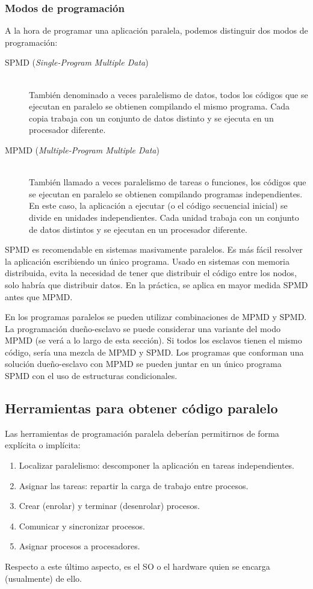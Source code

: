 \subsubsection{Modos de programación}
A la hora de programar una aplicación paralela, podemos distinguir dos modos de programación:
\begin{description}
    \item [SPMD (\emph{Single-Program Multiple Data})]~\\
        También denominado a veces paralelismo de datos, todos los códigos que se ejecutan en paralelo se obtienen compilando el mismo programa. Cada copia trabaja con un conjunto de datos distinto y se ejecuta en un procesador diferente.
    \item [MPMD (\emph{Multiple-Program Multiple Data})]~\\
        También llamado a veces paralelismo de tareas o funciones, los códigos que se ejecutan en paralelo se obtienen compilando programas independientes. En este caso, la aplicación a ejecutar (o el código secuencial inicial) se divide en unidades independientes. Cada unidad trabaja con un conjunto de datos distintos y se ejecutan en un procesador diferente.
\end{description}

SPMD es recomendable en sistemas masivamente paralelos. Es más fácil resolver la aplicación escribiendo un único programa. Usado en sistemas con memoria distribuida, evita la necesidad de tener que distribuir el código entre los nodos, solo habría que distribuir datos. En la práctica, se aplica en mayor medida SPMD antes que MPMD.

En los programas paralelos se pueden utilizar combinaciones de MPMD y SPMD\@. La programación dueño-esclavo se puede considerar una variante del modo MPMD (se verá a lo largo de esta sección). Si todos los esclavos tienen el mismo código, sería una mezcla de MPMD y SPMD\@. Los programas que conforman una solución dueño-esclavo con MPMD se pueden juntar en un único programa SPMD con el uso de estructuras condicionales.

\subsection{Herramientas para obtener código paralelo}
Las herramientas de programación paralela deberían permitirnos de forma explícita o implícita:
\begin{enumerate}
    \item Localizar paralelismo: descomponer la aplicación en tareas independientes.
    \item Asignar las tareas: repartir la carga de trabajo entre procesos.
    \item Crear (enrolar) y terminar (desenrolar) procesos.
    \item Comunicar y sincronizar procesos.
    \item Asignar procesos a procesadores.
\end{enumerate}
Respecto a este último aspecto, es el SO o el hardware quien se encarga (usualmente) de ello.\\

